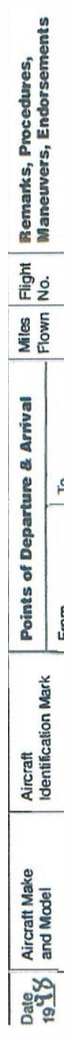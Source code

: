 \documentclass[10pt]{article}
\begin{document}
\includegraphics[max width=\textwidth, center]{2025_02_27_dd68c3d38de88f0516d9g-063}\\
\end{document}
